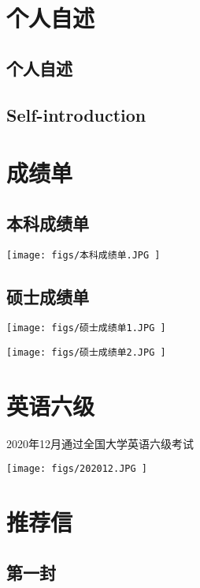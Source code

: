 \documentclass[UFT8]{ctexart}
\begin{document}
\clearpage
\section{个人自述}
\subsection{个人自述}
\subsection{Self-introduction}


\clearpage
\section{成绩单}
\subsection{本科成绩单}
\begin{center}
  \texttt{[image: figs/本科成绩单.JPG ]}
\end{center}

\subsection{ 硕士成绩单}
\begin{center}
  \texttt{[image: figs/硕士成绩单1.JPG ]}
\end{center}

\begin{center}
  \texttt{[image: figs/硕士成绩单2.JPG ]}
\end{center}



\clearpage
\section{英语六级}
2020年12月通过全国大学英语六级考试

\begin{center}
  \texttt{[image: figs/202012.JPG ]}
\end{center}

\clearpage
\section{推荐信}
\subsection{第一封}
\clearpage
\end{document}
